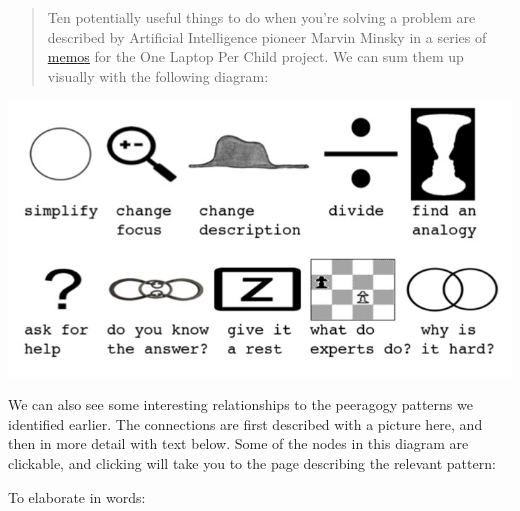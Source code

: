 \begin{quote}
Ten potentially useful things to do when you're solving a problem are
described by Artificial Intelligence pioneer Marvin Minsky in a series
of
\href{http://web.media.mit.edu/~minsky/OLPC-1.html}{m}\href{http://web.media.mit.edu/~minsky/OLPC-2.html}{e}\href{http://web.media.mit.edu/~minsky/OLPC-3.html}{m}\href{http://web.media.mit.edu/~minsky/OLPC-4.html}{o}\href{http://web.media.mit.edu/~minsky/OLPC-5.html}{s}
for the One Laptop Per Child project. We can sum them up visually with
the following diagram:
\end{quote}
\begin{center}
\includegraphics[width=\textwidth]{../pictures/heuristic-images.jpg}
\end{center}
We can also see some interesting relationships to the peeragogy patterns
we identified earlier. The connections are first described with a
picture here, and then in more detail with text below. Some of the nodes
in this diagram are clickable, and clicking will take you to the page
describing the relevant pattern:

To elaborate in words:

